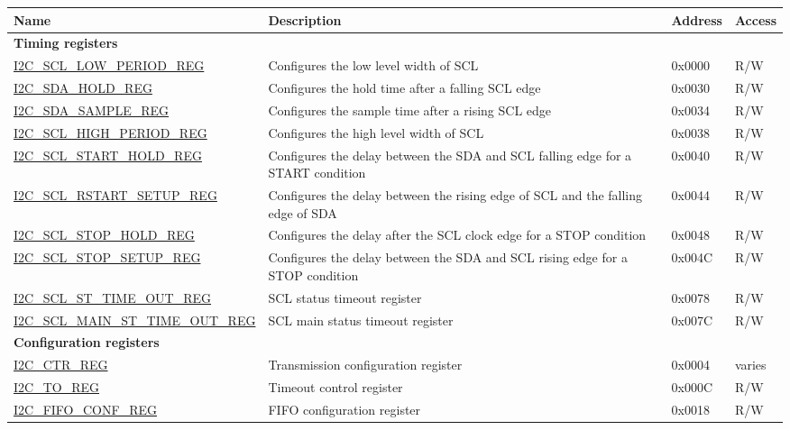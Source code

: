 \begin{longtable}{  | m{5.7cm} | m{7cm} | m{1.3cm} | m{1.5cm} | }
\hline\rowcolor{lightgray}
Name & Description &  Address & Access \\ \hline
\endhead
\multicolumn{4}{|l|}{\textbf{Timing registers}} \\ \hline
\hyperref[regdesc:I2CSCLLOWPERIODREG]{I2C\_SCL\_LOW\_PERIOD\_REG} & Configures the low level width of SCL & 0x0000 & R/W \\ \hline
\hyperref[regdesc:I2CSDAHOLDREG]{I2C\_SDA\_HOLD\_REG} & Configures the hold time after a falling SCL edge & 0x0030 & R/W \\ \hline
\hyperref[regdesc:I2CSDASAMPLEREG]{I2C\_SDA\_SAMPLE\_REG} & Configures the sample time after a rising SCL edge & 0x0034 & R/W \\ \hline
\hyperref[regdesc:I2CSCLHIGHPERIODREG]{I2C\_SCL\_HIGH\_PERIOD\_REG} & Configures the high level width of SCL & 0x0038 & R/W \\ \hline
\hyperref[regdesc:I2CSCLSTARTHOLDREG]{I2C\_SCL\_START\_HOLD\_REG} & Configures the delay between the SDA and SCL falling edge for a START condition & 0x0040 & R/W \\ \hline
\hyperref[regdesc:I2CSCLRSTARTSETUPREG]{I2C\_SCL\_RSTART\_SETUP\_REG} & Configures the delay between the rising edge of SCL and the falling edge of SDA & 0x0044 & R/W \\ \hline
\hyperref[regdesc:I2CSCLSTOPHOLDREG]{I2C\_SCL\_STOP\_HOLD\_REG} & Configures the delay after the SCL clock edge for a STOP condition & 0x0048 & R/W \\ \hline
\hyperref[regdesc:I2CSCLSTOPSETUPREG]{I2C\_SCL\_STOP\_SETUP\_REG} & Configures the delay between the SDA and SCL rising edge for a STOP condition & 0x004C & R/W \\ \hline
\hyperref[regdesc:I2CSCLSTTIMEOUTREG]{I2C\_SCL\_ST\_TIME\_OUT\_REG} & SCL status timeout register & 0x0078 & R/W \\ \hline
\hyperref[regdesc:I2CSCLMAINSTTIMEOUTREG]{I2C\_SCL\_MAIN\_ST\_TIME\_OUT\_REG} & SCL main status timeout register & 0x007C & R/W \\ \hline
\multicolumn{4}{|l|}{\textbf{Configuration registers}} \\ \hline
\hyperref[regdesc:I2CCTRREG]{I2C\_CTR\_REG} & Transmission configuration register & 0x0004 & varies \\ \hline
\hyperref[regdesc:I2CTOREG]{I2C\_TO\_REG} & Timeout control register & 0x000C & R/W \\ \hline
\hyperref[regdesc:I2CFIFOCONFREG]{I2C\_FIFO\_CONF\_REG} & FIFO configuration register & 0x0018 & R/W \\ \hline

\end{longtable}
